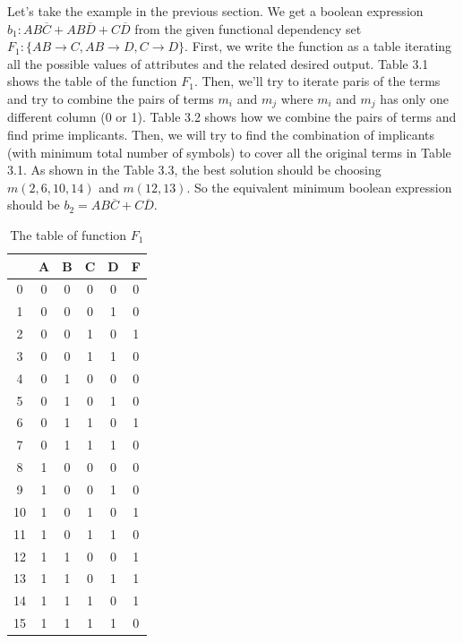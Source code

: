 \documentclass[11pt]{book}
\begin{document}
Let's take the example in the previous section. We get a boolean expression $b_1: AB\overline{C} + AB\overline{D} + C\overline{D}$ from the given functional dependency set $F_1: \{ AB \rightarrow C, AB \rightarrow D, C \rightarrow D \}$. First, we write the function as a table iterating all the possible values of attributes and the related desired output. Table 3.1 shows the table of the function $F_1$. Then, we'll try to iterate paris of the terms and try to combine the pairs of terms $m_i$ and $m_j$ where $m_i$ and $m_j$ has only one different column (0 or 1). Table 3.2 shows how we combine the pairs of terms and find prime implicants. Then, we will try to find the combination of implicants (with minimum total number of symbols) to cover all the original terms in Table 3.1. As shown in the Table 3.3, the best solution should be choosing $m(2, 6, 10, 14)$ and $m(12, 13)$. So the equivalent minimum boolean expression should be $b_2 = AB\overline{C} + C\overline{D}$. 

\begin{table}
	\centering
	
	\begin{tabular}{ |c|c|c|c|c|c| }
		\hline
		  & A & B & C & D & F \\
		\hline
		 0 & 0 & 0 & 0 & 0 & 0 \\
		 1 & 0 & 0 & 0 & 1 & 0 \\
		 2 & 0 & 0 & 1 & 0 & 1 \\
		 3 & 0 & 0 & 1 & 1 & 0 \\
		 4 & 0 & 1 & 0 & 0 & 0 \\
		 5 & 0 & 1 & 0 & 1 & 0 \\
		 6 & 0 & 1 & 1 & 0 & 1 \\
		 7 & 0 & 1 & 1 & 1 & 0 \\
		 8 & 1 & 0 & 0 & 0 & 0 \\
		 9 & 1 & 0 & 0 & 1 & 0 \\
		10 & 1 & 0 & 1 & 0 & 1 \\
		11 & 1 & 0 & 1 & 1 & 0 \\
		12 & 1 & 1 & 0 & 0 & 1 \\
		13 & 1 & 1 & 0 & 1 & 1 \\
		14 & 1 & 1 & 1 & 0 & 1 \\
		15 & 1 & 1 & 1 & 1 & 0 \\			
		\hline
	\end{tabular}

	\caption{The table of function $F_1$}
\end{table}
\end{document}
